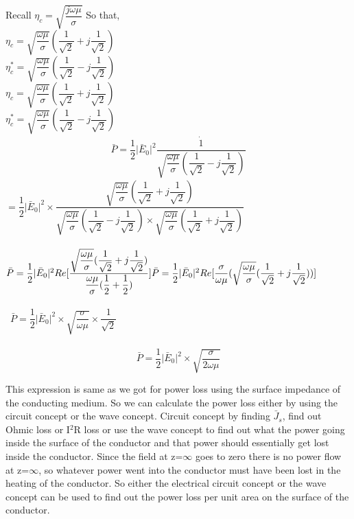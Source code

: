 Recall  $\eta_{c}=\sqrt{\dfrac{j\omega\mu}{\sigma}}$
So that,\\
$\eta_{c}=\sqrt{\dfrac{\omega\mu}{\sigma}}(\dfrac{1}{\sqrt{2}}+j\dfrac{1}{\sqrt{2}})$\\
$\eta_{c}^{\ast}=\sqrt{\dfrac{\omega\mu}{\sigma}}(\dfrac{1}{\sqrt{2}}-j\dfrac{1}{\sqrt{2}})$\\

$\eta_{c}=\sqrt{\dfrac{\omega\mu}{\sigma}}(\dfrac{1}{\sqrt{2}}+j\dfrac{1}{\sqrt{2}})$\\
$\eta_{c}^{\ast}=\sqrt{\dfrac{\omega\mu}{\sigma}}(\dfrac{1}{\sqrt{2}}-j\dfrac{1}{\sqrt{2}})$\\
\begin{align}
\bar{P}=\dfrac{1}{2}\lvert\bar{E}_{0}\rvert^{2}\dot{\dfrac{1}{\sqrt{\dfrac{\omega\mu}{\sigma}}(\dfrac{1}{\sqrt{2}}-j\dfrac{1}{\sqrt{2}})}} 
\end{align}
$=\dfrac{1}{2}\lvert\bar{E}_{0}\rvert^{2}\times \dfrac{\sqrt{\dfrac{\omega\mu}{\sigma}}(\dfrac{1}{\sqrt{2}}+j\dfrac{1}{\sqrt{2}})}{\sqrt{\dfrac{\omega\mu}{\sigma}}(\dfrac{1}{\sqrt{2}}-j\dfrac{1}{\sqrt{2}})\times \sqrt{\dfrac{\omega\mu}{\sigma}}(\dfrac{1}{\sqrt{2}}+j\dfrac{1}{\sqrt{2}})}$\\\\
$\bar{P}=\dfrac{1}{2}\lvert\bar{E}_{0}\rvert^{2}Re[\dfrac{\sqrt{\dfrac{\omega\mu}{\sigma}}(\dfrac{1}{\sqrt{2}}+j\dfrac{1}{\sqrt{2}})}{\dfrac{\omega\mu}{\sigma}(\dfrac{1}{2}+\dfrac{1}{2})}]\\\\
\bar{P}=\dfrac{1}{2}\lvert\bar{E}_{0}\rvert^{2}Re[\dfrac{\sigma}{\omega\mu}(\sqrt{\dfrac{\omega\mu}{\sigma}}(\dfrac{1}{\sqrt{2}}+j\dfrac{1}{\sqrt{2}}))]$\\\\\
$\bar{P}=\dfrac{1}{2}\lvert\bar{E}_{0}\rvert^{2}\times \sqrt{\dfrac{\sigma}{\omega\mu}}\times \dfrac{1}{\sqrt{2}}$\\\\
\begin{equation}
\bar{P}=\dfrac{1}{2}\lvert\bar{E}_{0}\rvert^{2}\times \sqrt{\dfrac{\sigma}{2\omega\mu}}
\end{equation}

This expression is same as we got for power loss using the surface impedance of the conducting medium. So we can calculate the power loss either by using the circuit concept or the wave concept. Circuit concept by finding $\bar{J}$$_{s}$, find out Ohmic loss or I$^{2}$R loss or use the wave concept to find out what the power going inside the surface of the conductor and that power should essentially get lost inside the conductor. Since the field at z=$\infty$ goes to zero there is no power flow at z=$\infty$, so whatever power went into the conductor must have been lost in the heating of the conductor. So either the electrical circuit concept or the wave concept can be used to find out the power loss per unit area on the surface of the conductor.

